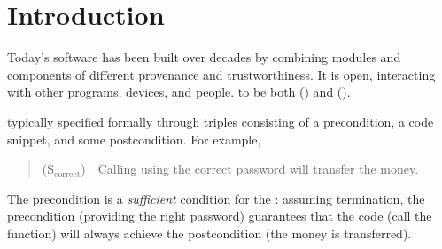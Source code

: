 \section{Introduction}
\label{s:intro}


Today's   software has been built 
over decades by combining modules and components of
different provenance and 
trustworthiness. It 
is open, interacting with other programs, devices, and people.
 to be both  () and  %
 (). %

 typically specified formally 
 through  triples consisting of a  precondition, a code snippet, and some
 postcondition. 
 For example,
 \begin{quote}
(S$_{\text{correct}}$)\ \ Calling  using the correct password will transfer the money.
\end{quote}
The precondition is a \emph{sufficient} condition for the : 
assuming termination, the precondition (\eg providing the right 
password) guarantees that
the code (\eg call the  function)
will always achieve the postcondition (the money is transferred).


 


